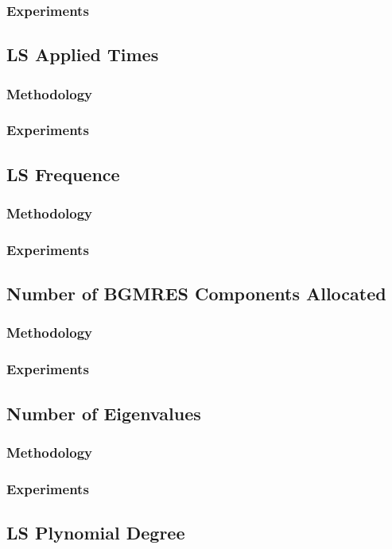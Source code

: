 \subsubsection{Experiments}
\subsection{LS Applied Times}
\subsubsection{Methodology}
\subsubsection{Experiments}
\subsection{LS Frequence}
\subsubsection{Methodology}
\subsubsection{Experiments}
\subsection{Number of BGMRES Components Allocated}
\subsubsection{Methodology}
\subsubsection{Experiments}
\subsection{Number of Eigenvalues}
\subsubsection{Methodology}
\subsubsection{Experiments}
\subsection{LS Plynomial Degree}
